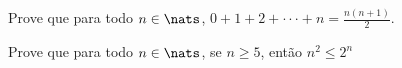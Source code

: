\begin{exercise}
%
Prove que para todo $n \in\nats$, $0 + 1 + 2 + \cdot\cdot\cdot + n = \frac {n(n+1)} 2$.
\end{exercise}

\begin{exercise}
%
Prove que para todo $n \in\nats$, se  $n \geq 5$, então $n^2 \leq 2^n$
\end{exercise}

